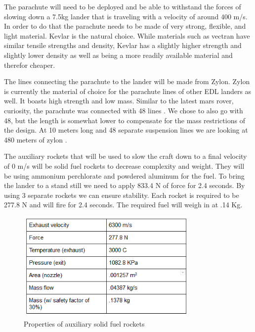 \documentclass[%
 portrait,
 aapm,
 mph,%
 amsmath,amssymb,
 reprint,%
]{revtex4-2}
\begin{document}
The parachute will need to be deployed and be able to withstand the forces of slowing down a 7.5kg lander that is traveling with a velocity of around 400 m/s.  In order to do that the parachute needs to be made of very strong, flexible, and light material.  Kevlar is the natural choice.  While materials such as vectran have similar tensile strengths and density, Kevlar has a slightly higher strength and slightly lower density as well as being a more readily available material and therefor cheaper.

The lines connecting the parachute to the lander will be made from Zylon.  Zylon is currently the material of choice for the parachute lines of other EDL landers as well.  It boasts high strength and low mass.  Similar to the latest mars rover, curiosity, the parachute was connected with 48 lines \cite{JPL:002}.  We chose to also go with 48, but the length is somewhat lower to compensate for the mass restrictions of the design.  At 10 meters long and 48 separate suspension lines we are looking at 480 meters of zylon \cite{NASAMarsExplorationRovers:001}.

The auxiliary rockets that will be used to slow the craft down to a final velocity of 0 m/s will be solid fuel rockets to decrease complexity and weight.  They will be using ammonium perchlorate and powdered aluminum for the fuel.  To bring the lander to a stand still we need to apply 833.4 N of force for 2.4 seconds.  By using 3 separate rockets we can ensure stability.  Each rocket is required to be 277.8 N and will fire for 2.4 seconds.  The required fuel will weigh in at .14 Kg.
\begin{figure}[h!]
  \includegraphics[width=250pt]{DescentandLanding/yauxRocketTB.png}
   \caption{Properties of auxiliary solid fuel rockets}
\end{figure} 
\end{document}
